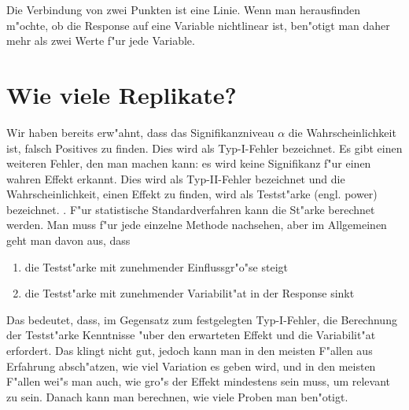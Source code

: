 \documentclass[a4paper,twoside]{tufte-book}\usepackage[]{graphicx}\usepackage[]{color}
\begin{document}
Die Verbindung von zwei Punkten ist eine Linie. Wenn man herausfinden m"ochte, ob die Response auf eine Variable nichtlinear ist, ben"otigt man daher mehr als zwei Werte f"ur jede Variable. 


\section{Wie viele Replikate?}

Wir haben bereits erw"ahnt, dass das Signifikanzniveau $\alpha$ die Wahrscheinlichkeit ist, falsch Positives zu finden. Dies wird als Typ-I-Fehler bezeichnet. Es gibt einen weiteren Fehler, den man machen kann: es wird keine Signifikanz f"ur einen wahren Effekt erkannt. Dies wird als Typ-II-Fehler bezeichnet und die Wahrscheinlichkeit, einen Effekt zu finden, wird als Testst"arke (engl. power) bezeichnet. . F"ur statistische Standardverfahren kann die St"arke berechnet werden. Man muss f"ur jede einzelne Methode nachsehen, aber im Allgemeinen geht man davon aus, dass 

\begin{enumerate}
\item die Testst"arke mit zunehmender Einflussgr"o"se steigt 
\item die Testst"arke mit zunehmender Variabilit"at in der Response sinkt
\end{enumerate}

Das bedeutet, dass, im Gegensatz zum festgelegten Typ-I-Fehler, die Berechnung der Testst"arke Kenntnisse "uber den erwarteten Effekt und die Variabilit"at erfordert. Das klingt nicht gut, jedoch kann man in den meisten F"allen aus Erfahrung absch"atzen, wie viel Variation es geben wird, und in den meisten F"allen wei"s man auch, wie gro"s der Effekt mindestens sein muss, um relevant zu sein. Danach kann man berechnen, wie viele Proben man ben"otigt.
\end{document}
